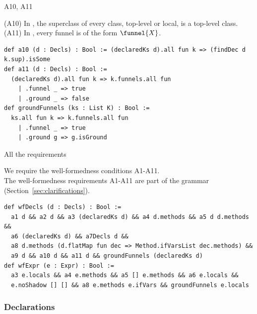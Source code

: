 \begin{cmp}{A10, A11}
\begin{paperside}
(A10) In \decls, the superclass of every class, top-level or local, is a top-level class.\\
(A11) In \decls, every funnel is of the form $\funnel{X}$.
\end{paperside}
\begin{leanside}
\begin{lstlisting}[style=leanside]
def a10 (d : Decls) : Bool := (declaredKs d).all fun k => (findDec d k.sup).isSome
def a11 (d : Decls) : Bool :=
  (declaredKs d).all fun k => k.funnels.all fun
    | .funnel _ => true
    | .ground _ => false
def groundFunnels (ks : List K) : Bool :=
  ks.all fun k => k.funnels.all fun
    | .funnel _ => true
    | .ground g => g.isGround
\end{lstlisting}
\end{leanside}
\end{cmp}

\begin{cmp}{All the requirements}
\begin{paperside}
We require the well-formedness conditions A1-A11.\\[1ex]
The well-formedness requirements A1-A11 are part of the grammar (Section~\ref{sec:clarifications}).
\end{paperside}
\begin{leanside}
\begin{lstlisting}[style=leanside]
def wfDecls (d : Decls) : Bool :=
  a1 d && a2 d && a3 (declaredKs d) && a4 d.methods && a5 d d.methods &&
  a6 (declaredKs d) && a7Decls d &&
  a8 d.methods (d.flatMap fun dec => Method.ifVarsList dec.methods) &&
  a9 d && a10 d && a11 d && groundFunnels (declaredKs d)
def wfExpr (e : Expr) : Bool :=
  a3 e.locals && a4 e.methods && a5 [] e.methods && a6 e.locals &&
  e.noShadow [] [] && a8 e.methods e.ifVars && groundFunnels e.locals
\end{lstlisting}
\end{leanside}
\end{cmp}

\subsubsection{Declarations}

